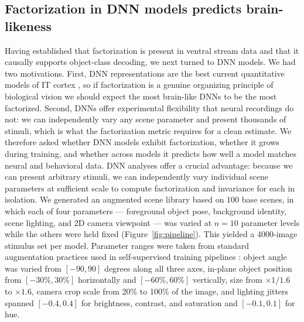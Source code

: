 \documentclass[11pt]{article}
\begin{document}
\subsection{Factorization in DNN models predicts brain-likeness}

Having established that factorization is present in ventral stream data and
that it causally supports object-class decoding, we next turned to DNN
models. We had two motivations. First, DNN representations are the best
current quantitative models of IT cortex
\citep{yamins2014performance, yamins2016using, khalighrazavi2014deep},
so if factorization is a genuine organizing principle of biological vision
we should expect the most brain-like DNNs to be the most factorized. Second,
DNNs offer experimental flexibility that neural recordings do not: we can
independently vary any scene parameter and present thousands of stimuli,
which is what the factorization metric requires for a clean estimate. We
therefore asked whether DNN models exhibit factorization, whether it grows
during training, and whether across models it predicts how well a model
matches neural and behavioral data. DNN analyses offer a crucial advantage: because we can
present arbitrary stimuli, we can independently vary individual scene
parameters at sufficient scale to compute factorization and invariance for
each in isolation. We generated an augmented scene library based on 100
base scenes, in which each of four parameters --- foreground object pose,
background identity, scene lighting, and 2D camera viewpoint --- was varied
at \(n=10\) parameter levels while the others were held fixed
(Figure~\ref{fig:pipeline}). This yielded a 4000-image stimulus set per
model. Parameter ranges were taken from standard augmentation practices
used in self-supervised training pipelines
\citep{chen2020simple, he2020momentum}: object angle was varied from
\([-90,90]\) degrees along all three axes, in-plane object position from
\([-30\%,30\%]\) horizontally and \([-60\%,60\%]\) vertically, size from
\(\times 1/1.6\) to \(\times 1.6\), camera crop scale from 20\% to 100\% of
the image, and lighting jitters spanned \([-0.4,0.4]\) for brightness,
contrast, and saturation and \([-0.1,0.1]\) for hue.
\end{document}
